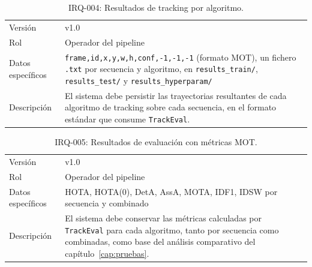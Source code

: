 \begin{table}[htp]
\centering
\caption{IRQ-004: Resultados de tracking por algoritmo.}
\label{tab:irq-004}
\renewcommand{\arraystretch}{1.2}
\begin{tabular}{|p{3.1cm}|p{9.2cm}|}
\hline
\rowcolor{gray!25}
\multicolumn{2}{|l|}{\textbf{IRQ-004 -- Resultados de tracking por algoritmo}} \\
\hline
Versión & v1.0 \\
\hline
Rol & Operador del pipeline \\
\hline
Datos específicos & \texttt{frame,id,x,y,w,h,conf,-1,-1,-1} (formato MOT),
  un fichero \texttt{.txt} por secuencia y algoritmo, en
  \texttt{results\_train/}, \texttt{results\_test/} y
  \texttt{results\_hyperparam/} \\
\hline
Descripción & El sistema debe persistir las trayectorias resultantes de
  cada algoritmo de tracking sobre cada secuencia, en el formato estándar
  que consume \texttt{TrackEval}. \\
\hline
\end{tabular}
\end{table}

\begin{table}[htp]
\centering
\caption{IRQ-005: Resultados de evaluación con métricas MOT.}
\label{tab:irq-005}
\renewcommand{\arraystretch}{1.2}
\begin{tabular}{|p{3.1cm}|p{9.2cm}|}
\hline
\rowcolor{gray!25}
\multicolumn{2}{|l|}{\textbf{IRQ-005 -- Resultados de evaluación con métricas MOT}} \\
\hline
Versión & v1.0 \\
\hline
Rol & Operador del pipeline \\
\hline
Datos específicos & HOTA, HOTA(0), DetA, AssA, MOTA, IDF1, IDSW por
  secuencia y combinado \\
\hline
Descripción & El sistema debe conservar las métricas calculadas por
  \texttt{TrackEval} para cada algoritmo, tanto por secuencia como
  combinadas, como base del análisis comparativo del
  capítulo~\ref{cap:pruebas}. \\
\hline
\end{tabular}
\end{table}

